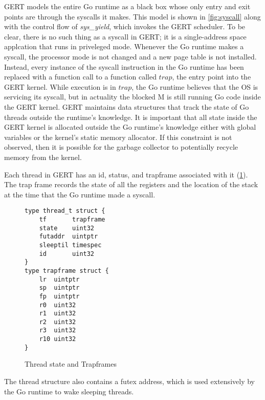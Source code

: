 GERT models the entire Go runtime as a black box whose only entry and exit points
are through the syscalls it makes. This model is shown in \ref{fig:syscall} along with the
control flow of \textit{sys\_yield}, which invokes the GERT scheduler. To be clear, there is no such thing as a syscall in GERT;
it is a single-address space applcation that runs in priveleged mode.
Whenever the Go runtime makes a syscall, the processor mode is not changed and a new page table
is not installed. Instead, every instance of the syscall instruction in the Go runtime has been
replaced with a function call to a function called $trap$, the entry point into the GERT kernel.
While execution is in $trap$, the Go runtime believes
that the OS is servicing its syscall, but in actuality the blocked M is still running Go code inside
the GERT kernel. GERT maintains data structures that track the state of Go threads
outside the runtime's knowledge. It is important that all state inside the GERT kernel is
allocated outside the Go runtime's knowledge either with global variables or the kernel's
static memory allocator. If this constraint is not observed, then it is possible for the garbage collector
to potentially recycle memory from the kernel.

Each thread in GERT has an id, status, and trapframe associated with it (\ref{fig:threadtrap}).
The trap frame records the state of all the registers and the location of the stack at
the time that the Go runtime made a syscall.

\begin{figure}[h]
  \begin{lstlisting}
type thread_t struct {
	tf       trapframe
	state    uint32
	futaddr  uintptr
	sleeptil timespec
	id       uint32
}
type trapframe struct {
	lr  uintptr
	sp  uintptr
	fp  uintptr
	r0  uint32
	r1  uint32
	r2  uint32
	r3  uint32
	r10 uint32
}
\end{lstlisting}

  \caption{Thread state and Trapframes} \label{fig:threadtrap}
\end{figure}

The thread structure also contains a futex address, which is used extensively
by the Go runtime to wake sleeping threads.

